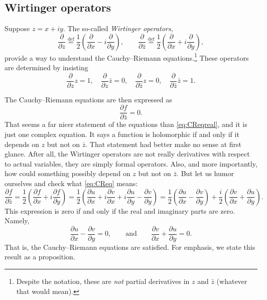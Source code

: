 \documentclass[12pt,openany]{book}
\newcommand{\myindex}[1]{#1\index{#1}}
\theoremstyle{plain}
\theoremstyle{remark}
\theoremstyle{definition}
\theoremstyle{exercise}
\theoremstyle{example}
\begin{document}
\subsection{Wirtinger operators}

Suppose $z=x+iy$.
The so-called \emph{\myindex{Wirtinger operators}},
\begin{equation*}
\frac{\partial}{\partial z}
\overset{\text{def}}{=}
\frac{1}{2}
\left(
\frac{\partial}{\partial x} - i
\frac{\partial}{\partial y}
\right),
\qquad
\frac{\partial}{\partial \bar{z}}
\overset{\text{def}}{=}
\frac{1}{2}
\left(
\frac{\partial}{\partial x} + i
\frac{\partial}{\partial y}
\right)
,
\end{equation*}
provide a way to understand the
Cauchy--Riemann equations.\footnote{Despite the notation, these are
\emph{not} partial derivatives in $z$ and $\bar{z}$
(whatever that would mean).}
These operators are determined by insisting
%
\begin{equation*}
\frac{\partial}{\partial z} z = 1, \quad
\frac{\partial}{\partial z} \bar{z} = 0, \quad
\frac{\partial}{\partial \bar{z}} z = 0, \quad
\frac{\partial}{\partial \bar{z}} \bar{z} = 1.
\end{equation*}

The Cauchy--Riemann equations are then expressed as
\begin{equation} \label{eq:CReq}
\frac{\partial f}{\partial \bar{z}} = 0 .
\end{equation}
That seems a far nicer statement of the equations than \eqref{eq:CReqreal},
and it is just one complex equation.  
It says
a function is holomorphic if and only if it depends on $z$ but not on
$\bar{z}$.  That statement had better make no sense at first glance.
After all, the Wirtinger operators are not really derivatives with
respect to actual variables,
they are simply formal operators.
Also, and more importantly,
how could something possibly depend on $z$ but not on $\bar{z}$.
But let us humor ourselves and check what \eqref{eq:CReq} means:
\begin{equation*}
\frac{\partial f}{\partial \bar{z}} 
=
\frac{1}{2}
\left(
\frac{\partial f}{\partial x} + i
\frac{\partial f}{\partial y}
\right)
=
\frac{1}{2}
\left(
\frac{\partial u}{\partial x} 
+ i \frac{\partial v}{\partial x} 
+ i \frac{\partial u}{\partial y}
- \frac{\partial v}{\partial y}
\right) 
=
\frac{1}{2}
\left(
\frac{\partial u}{\partial x} 
- \frac{\partial v}{\partial y}
\right)
+
\frac{i}{2}
\left(
\frac{\partial v}{\partial x} 
+ \frac{\partial u}{\partial y}
\right) .
\end{equation*}
This expression is zero if and only if the real and imaginary
parts are zero.  Namely,
\begin{equation*}
\frac{\partial u}{\partial x} 
- \frac{\partial v}{\partial y}
= 0,
\qquad
\text{and}
\qquad
\frac{\partial v}{\partial x} 
+ \frac{\partial u}{\partial y} = 0
.
\end{equation*}
That is, the Cauchy--Riemann equations are satisfied.  For emphasis,
we state this result as a proposition.
\end{document}
